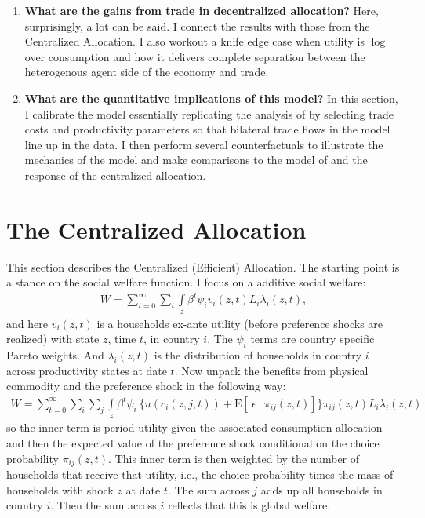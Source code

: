 \documentclass[12pt,pdftex]{article}
\begin{document}
\begin{onehalfspacing}
\begin{enumerate}
\item \textbf{What are the gains from trade in decentralized allocation?} Here, surprisingly, a lot can be said. I connect the results with those from the Centralized Allocation. I also workout a knife edge case when utility is $\log$ over consumption and how it delivers complete separation between the heterogenous agent side of the economy and trade.

\item \textbf{What are the quantitative implications of this model?} In this section, I calibrate the model essentially replicating the analysis of \citet{eaton2002technology} by selecting trade costs and productivity parameters so that bilateral trade flows in the model line up in the data. I then perform several counterfactuals to illustrate the mechanics of the model and make comparisons to the model of \citet{eaton2002technology} and the response of the centralized allocation.
\end{enumerate}

\section{The Centralized Allocation}\label{sec:planner}

This section describes the Centralized (Efficient) Allocation. The starting point is a stance on the social welfare function. I focus on a additive social welfare:
\begin{align}
W = \sum_{t=0}^{\infty} \sum_{i}  \int\limits_{z} \beta^{t} \psi_{i} v_{i}(z,t) L_{i}\lambda_{i}(z,t),
\nonumber
\end{align}
and here $v_i(z,t)$ is a households ex-ante utility (before preference shocks are realized) with state $z$, time $t$, in country $i$. The $\psi_{i}$ terms are country specific Pareto weights. And $\lambda_{i}(z,t)$ is the distribution of households in country $i$ across productivity states at date $t$. Now unpack the benefits from physical commodity and the preference shock in the following way:
\begin{align}
W = \sum_{t=0}^{\infty}  \sum_{i} \sum_{j} \int\limits_{z}  \beta^{t} \psi_{i} \  \bigg \{  u(c_{i}(z, j, t) ) + \mathrm{E}[ \ \epsilon \ | \ \pi_{ij}(z,t) ] \bigg \}\pi_{ij}(z,t) L_{i} \lambda_{i}(z, t)
\label{eq:social-welfare-2}
\end{align}
so the inner term is period utility given the associated consumption allocation and then the expected value of the preference shock conditional on the choice probability $\pi_{ij}(z,t)$. This inner term is then weighted by the number of households that receive that utility, i.e., the choice probability times the mass of households with shock $z$ at date $t$. The sum across $j$ adds up all households in country $i$. Then the sum across $i$ reflects that this is global welfare.


\end{onehalfspacing}
\end{document}
